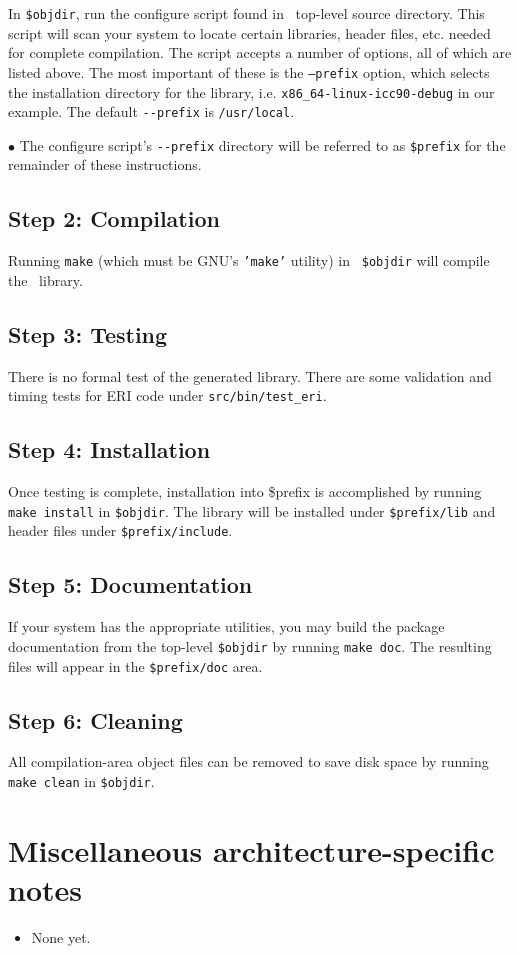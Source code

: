 \documentclass[12pt]{article}
\begin{document}
In {\tt \$objdir}, run the configure script found in \LIBINT\
top-level source directory.  This script will scan your system to locate
certain libraries, header files, etc. needed for complete compilation.
The script accepts a number of options, all of which are listed above.
The most important of these is the {\tt --prefix} option, which selects the
installation directory for the library, i.e. {\tt x86\_64-linux-icc90-debug} in our example.
The default {\tt -}{\tt -prefix} is {\tt /usr/local}.

$\bullet$ The configure script's {\tt -}{\tt -prefix} directory will be referred
to as {\tt \$prefix} for the remainder of these instructions.

\subsection{Step 2: Compilation}

Running {\tt make} (which must be GNU's {\tt 'make'} utility) in {\tt
\$objdir} will compile the \LIBINT\ library.

\subsection{Step 3: Testing}

There is no formal test of the generated library. There are some validation
and timing tests for ERI code under {\tt src/bin/test_eri}.

\subsection{Step 4: Installation}

Once testing is complete, installation into \$prefix is accomplished by
running {\tt make install} in {\tt \$objdir}.  The library will be
installed under {\tt \$prefix/lib} and header files under {\tt \$prefix/include}.

\subsection{Step 5: Documentation}

If your system has the appropriate utilities, you may build the package
documentation from the top-level {\tt \$objdir} by running {\tt make doc}.  
The resulting files will appear in the {\tt \$prefix/doc} area.

\subsection{Step 6: Cleaning}

All compilation-area object files can be removed to save
disk space by running {\tt make clean} in {\tt \$objdir}.

\section{Miscellaneous architecture-specific notes}
\begin{itemize}
\item None yet.
\end{itemize}
\end{document}

